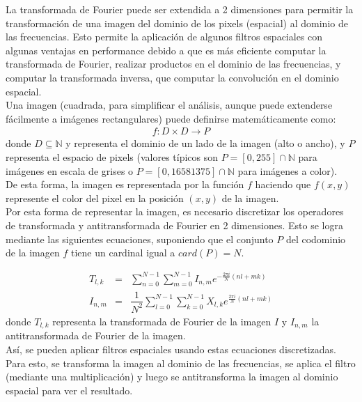 \documentclass[11pt,a4paper]{emulateapj}
\begin{document}
La transformada de Fourier puede ser extendida a 2 dimensiones para permitir la transformación de una imagen 
del dominio de los pixels (espacial) al dominio de las frecuencias. Esto permite la aplicación de algunos filtros
espaciales con algunas ventajas en performance debido a que es más eficiente computar la transformada
de Fourier, realizar productos en el dominio de las frecuencias, y computar la transformada inversa,
que computar la convolución en el dominio espacial.\citet*{bou98} \\

Una imagen (cuadrada, para simplificar el análisis, aunque puede extenderse fácilmente a imágenes rectangulares)
puede definirse matemáticamente como:
\begin{eqnarray}
f:D \times D \rightarrow P
\end{eqnarray}
donde $D \subseteq  \mathbb{N} $ y representa el dominio de un lado de la imagen (alto o ancho), 
y $P$ representa el espacio de pixels (valores típicos son $P=[0,255]\cap\mathbb{N}$ para imágenes
en escala de grises o $P=[0,16581375]\cap\mathbb{N}$ para imágenes a color). \\

De esta forma, la imagen es representada por la función $f$ haciendo que $f(x,y)$ represente el color
del pixel en la posición $(x,y)$ de la imagen. \\

Por esta forma de representar la imagen, es necesario discretizar los operadores de transformada y 
antitransformada de Fourier en 2 dimensiones. Esto se logra mediante las siguientes ecuaciones, suponiendo que el conjunto $P$ del codominio de la imagen $f$ tiene un cardinal igual a $card(P)= N$.

\begin{eqnarray}
T_{l,k} &=& \sum_{n=0}^{N-1}\sum_{m=0}^{N-1} I_{n,m}e^{-\frac{2\pi i}{N}(nl+mk)} \\
I_{n,m} &=& \dfrac{1}{N^2}\sum_{l=0}^{N-1}\sum_{k=0}^{N-1} X_{l,k}e^{\frac{2\pi i}{N}(nl+mk)} 
\end{eqnarray}
donde $T_{l,k} $ representa la transformada de Fourier de la imagen $I$ y $I_{n,m} $ la antitransformada de Fourier de la imagen.\\

Así, se pueden aplicar filtros espaciales usando estas ecuaciones discretizadas. Para esto, se transforma la imagen
al dominio de las frecuencias, se aplica el filtro (mediante una multiplicación) y luego se antitransforma la imagen
al dominio espacial para ver el resultado.
\end{document}
